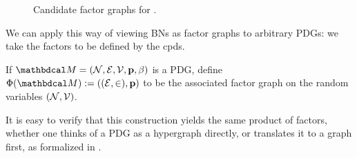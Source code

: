 {\begin{figure}[htb]
\begin{subfigure}[b]{0.3\linewidth}
{}
		\caption{}\label{subfig:fg-smoking}
	\end{subfigure}%
	\caption{Candidate factor graphs for .
	}
	\label{fig:fg-intro-examples}
\end{figure}

We can apply this way of viewing BNs as factor graphs to arbitrary
PDGs: we take the factors to be defined by the cpds.
\begin{defn}
	If $\dg M = \pdgvars[]$ is a PDG, define 
	$ \Phi(\dg M) := ((\Ed,\in), \mat p)$
	to be the associated factor graph on the random
			variables $(\mathcal N, \mathcal V)$. 
\end{defn}
\begin{remark}
	It is easy to verify that this construction yields the 
			same product of factors, whether one thinks of a PDG
			as a hypergraph directly, or translates it to a graph
			first, as formalized in . 
\end{remark}

}
